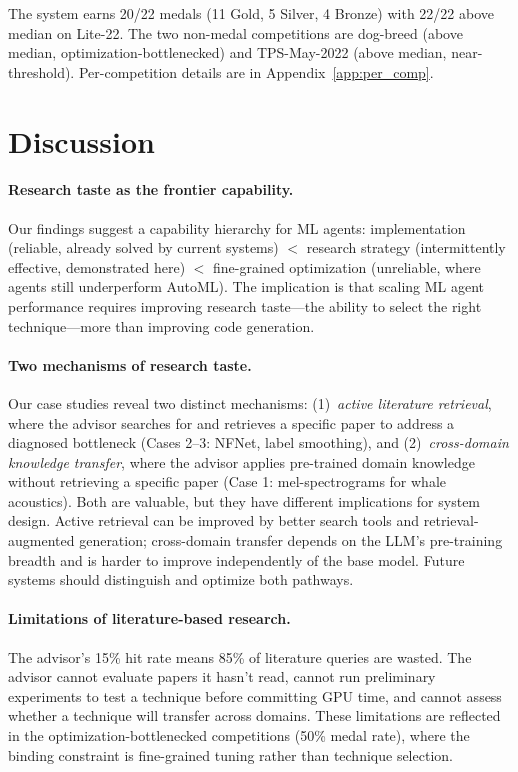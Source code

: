 \documentclass{article}
\begin{document}
The system earns 20/22 medals (11 Gold, 5 Silver, 4 Bronze) with 22/22 above median on Lite-22. The two non-medal competitions are dog-breed (above median, optimization-bottlenecked) and TPS-May-2022 (above median, near-threshold). Per-competition details are in Appendix~\ref{app:per_comp}.

\section{Discussion}
\label{sec:discussion}

\paragraph{Research taste as the frontier capability.}
Our findings suggest a capability hierarchy for ML agents: implementation (reliable, already solved by current systems) $<$ research strategy (intermittently effective, demonstrated here) $<$ fine-grained optimization (unreliable, where agents still underperform AutoML). The implication is that scaling ML agent performance requires improving research taste---the ability to select the right technique---more than improving code generation.

\paragraph{Two mechanisms of research taste.}
Our case studies reveal two distinct mechanisms: (1)~\emph{active literature retrieval}, where the advisor searches for and retrieves a specific paper to address a diagnosed bottleneck (Cases 2--3: NFNet, label smoothing), and (2)~\emph{cross-domain knowledge transfer}, where the advisor applies pre-trained domain knowledge without retrieving a specific paper (Case 1: mel-spectrograms for whale acoustics). Both are valuable, but they have different implications for system design. Active retrieval can be improved by better search tools and retrieval-augmented generation; cross-domain transfer depends on the LLM's pre-training breadth and is harder to improve independently of the base model. Future systems should distinguish and optimize both pathways.

\paragraph{Limitations of literature-based research.}
The advisor's 15\% hit rate means 85\% of literature queries are wasted. The advisor cannot evaluate papers it hasn't read, cannot run preliminary experiments to test a technique before committing GPU time, and cannot assess whether a technique will transfer across domains. These limitations are reflected in the optimization-bottlenecked competitions (50\% medal rate), where the binding constraint is fine-grained tuning rather than technique selection.
\end{document}

